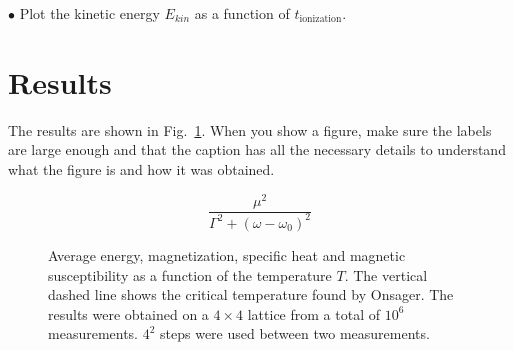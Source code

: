 \documentclass[a4paper,12pt]{article}
\begin{document}
$\bullet$ Plot the kinetic energy $E_{kin}$ as a function of $t_{\mathrm{ionization}}$.\\


\section{Results}

The results are shown in Fig.~\ref{fig:averages}. When you show a figure, make
sure the labels are large enough and that the caption has all the necessary details
to understand what the figure is and how it was obtained.

\begin{figure}[H]
\begin{center}
%
%
\caption{Average energy, magnetization, specific heat and magnetic
susceptibility as a function of the temperature $T$.  The vertical dashed line
shows the critical temperature found by Onsager. The results were obtained
on a $4 \times 4$ lattice from a total of $10^6$ measurements. $4^2$ steps
were used between two measurements.}\label{fig:averages}
%

$$\frac{\mu^2}{\Gamma^2+(\omega-\omega_0)^2}$$
\end{center}
\end{figure}
\end{document}
